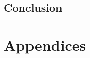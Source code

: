 \documentclass[
	letterpaper, %
	10pt, %
	unnumberedsections, %
	twoside, %
]{APAAssignment}
\begin{document}
\section{Conclusion}

\clearpage
\printbibliography %




%


\clearpage
\chapter{Appendices}
\end{document}

